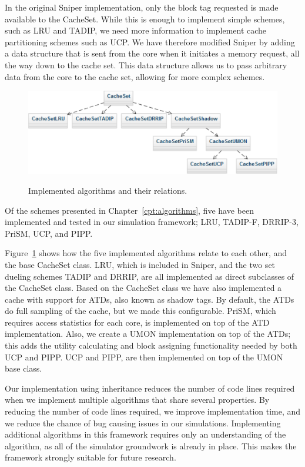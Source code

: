 In the original Sniper implementation, only the block tag requested is made available to the CacheSet. 
While this is enough to implement simple schemes, such as LRU and TADIP, we need more information to implement cache partitioning schemes such as UCP.
We have therefore modified Sniper by adding a data structure that is sent from the core when it initiates a memory request, all the way down to the cache set.
This data structure allows us to pass arbitrary data from the core to the cache set, allowing for more complex schemes.

\begin{figure}[ht]
\centering
\includegraphics[scale=0.7]{figures/framework/algorithms}
\label{fig:framework:implementation:algorithms}
\caption{Implemented algorithms and their relations.}
\end{figure}

Of the schemes presented in Chapter~\ref{cpt:algorithms}, five have been implemented and tested in our simulation framework; LRU, TADIP-F, DRRIP-3, PriSM, UCP, and PIPP.

Figure~\ref{fig:framework:implementation:algorithms} shows how the five implemented algorithms relate to each other, and the base CacheSet class.
LRU, which is included in Sniper, and the two set dueling schemes TADIP and DRRIP, are all implemented as direct subclasses of the CacheSet class.
Based on the CacheSet class we have also implemented a cache with support for ATDs, also known as shadow tags.
By default, the ATDs do full sampling of the cache, but we made this configurable.
PriSM, which requires access statistics for each core, is implemented on top of the ATD implementation.
Also, we create a UMON implementation on top of the ATDs; this adds the utility calculating and block assigning functionality needed by both UCP and PIPP.
UCP and PIPP, are then implemented on top of the UMON base class.

Our implementation using inheritance reduces the number of code lines required when we implement multiple algorithms that share several properties.
By reducing the number of code lines required, we improve implementation time, and we reduce the chance of bug causing issues in our simulations.
Implementing additional algorithms in this framework requires only an understanding of the algorithm, as all of the simulator groundwork is already in place.
This makes the framework strongly suitable for future research.